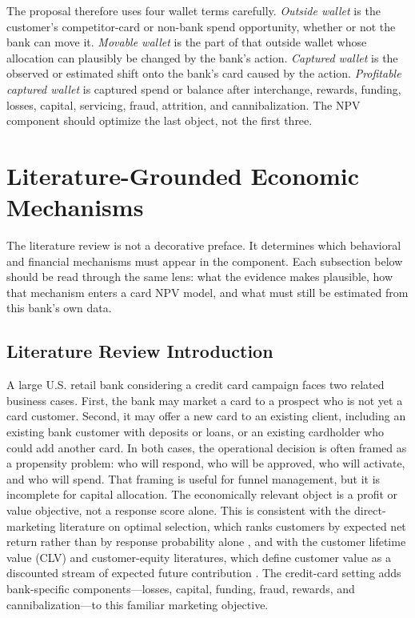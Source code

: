 \documentclass[11pt]{article}
\newcommand{\1}{\mathbf{1}}
\begin{document}
The proposal therefore uses four wallet terms carefully. \emph{Outside wallet}
is the customer's competitor-card or non-bank spend opportunity, whether or
not the bank can move it. \emph{Movable wallet} is the part of that outside
wallet whose allocation can plausibly be changed by the bank's action.
\emph{Captured wallet} is the observed or estimated shift onto the bank's card
caused by the action. \emph{Profitable captured wallet} is captured spend or
balance after interchange, rewards, funding, losses, capital, servicing, fraud,
attrition, and cannibalization. The NPV component should optimize the last
object, not the first three.


\section{Literature-Grounded Economic Mechanisms}
\label{sec:v3-literature-mechanisms}

The literature review is not a decorative preface.  It determines which
behavioral and financial mechanisms must appear in the component.  Each
subsection below should be read through the same lens: what the evidence makes
plausible, how that mechanism enters a card NPV model, and what must still be
estimated from this bank's own data.

\subsection{Literature Review Introduction}

A large U.S. retail bank considering a credit card campaign faces two related
business cases. First, the bank may market a card to a prospect who is not yet a
card customer. Second, it may offer a new card to an existing client, including
an existing bank customer with deposits or loans, or an existing cardholder who
could add another card. In both cases, the operational decision is often framed
as a propensity problem: who will respond, who will be approved, who will
activate, and who will spend. That framing is useful for funnel management, but
it is incomplete for capital allocation. The economically relevant object is a
profit or value objective, not a response score alone. This is consistent with
the direct-marketing literature on optimal selection, which ranks customers by
expected net return rather than by response probability alone
\citep{bult1995directmail}, and with the customer lifetime value (CLV) and
customer-equity literatures, which define customer value as a discounted stream
of expected future contribution \citep{berger1998clv,rust2004return,venkatesan2004clv}.
The credit-card setting adds bank-specific components---losses, capital,
funding, fraud, rewards, and cannibalization---to this familiar marketing
objective.
\end{document}
